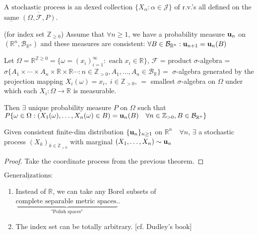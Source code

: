\documentclass[11pt]{article}
\begin{document}
\begin{definition}
    A $\underline{\text{stochastic process}}$ is an dexed collection 
    $\{ X_{\alpha}: \alpha \in \mathcal{J} \}$ of r.v.'s all defined on the $\underline{\text{same}}$
    $(\Omega, \mathcal{F}, P)$.
\end{definition}

\begin{theorem}
    (for index set $\mathbb{Z}_{\ge 0}$) Assume that $\forall n \ge 1$, we have a probability measure
    ${\mathbf{u}}_{n}$ on $(\mathbb{R}^{n}, \mathcal{B}_{\mathbb{R}^{n}})$ and these measures are 
    consistent: $\forall  B \in \mathcal{B}_{\mathbb{R}^{n}}: {\mathbf{u}}_{n+1} = 
    {\mathbf{u}}_{n}(B)$

    Let $\Omega = \mathbb{R}^{\mathbb{Z} \ge 0} = \{ \omega = (x_i)_{i=1}^{\infty}: 
    \text{ each } x_i \in \mathbb{R} \}$, $\mathcal{F}$ = product $\sigma$-algebra = 
    $\sigma \{ A_1 \times \cdots \times A_n \times \mathbb{R}
    \times \mathbb{R} \cdots: n \in \mathbb{Z}_{> 0}, A_1, 
    \ldots ,A_n \in \mathcal{B}_{\mathbb{R}} \} =$ $\sigma$-algebra generated by the projection mapping
    $X_{i}(\omega) =x_i, \; i \in \mathbb{Z}_{>0},\,=$ smallest $\sigma$-algebra on $\Omega$ under
    which each $X_{i}: \Omega \to \mathbb{R}$ is measurable.

    Then $\exists $ unique probability measure $P$ on $\Omega$ such that $P \{ 
        \omega \in \Omega: (X_{1}(\omega), \ldots ,X_n(\omega) \in B) = {\mathbf{u}}_{n}(B) \quad
        \forall n \in \mathbb{Z}_{>0}, B \in \mathcal{B}_{\mathbb{R}^{n}}
     \}$
\end{theorem}

\begin{theorem}
    Given consistent finite-dim distribution $\{ {\mathbf{u}}_{n} \}_{n \ge 1}$ on $\mathbb{R}^{n} \quad
    \forall n$, $\exists $ a stochastic process $(X_{k})_{k \in \mathbb{Z}_{>0}}$ with marginal
    $(X_1, \ldots ,X_n) \sim {\mathbf{u}}_{n}$
\end{theorem}
\begin{proof}
    Take the coordinate process from the previous theorem.
\end{proof}

$\underline{\text{Generalizations:}}$ 
\begin{enumerate}
    \item Instead of $\mathbb{R}$, we can take any Borel subsets of 
    $\underbrace{\text{complete separable metric spaces.}}_{\text{"Polish spaces"}}$.
    \item The index set can be totally arbitrary. [cf. Dudley's book]
\end{enumerate}
\end{document}
